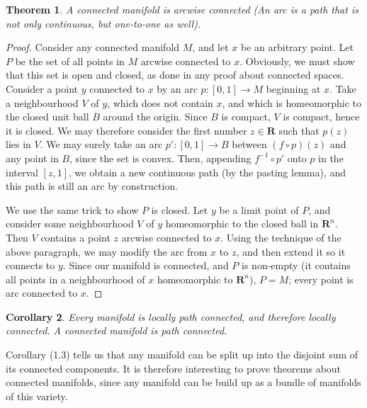 \documentclass[12pt]{report}
\theoremstyle{plain}
\newtheorem{theorem}{Theorem}[chapter]
\newtheorem{corollary}[theorem]{Corollary}
\theoremstyle{definition}
\begin{document}
\begin{theorem}
    A connected manifold is arcwise connected (An arc is a path that is not only continuous, but one-to-one as well).
\end{theorem}
\begin{proof}
    Consider any connected manifold $M$, and let $x$ be an arbitrary point. Let $P$ be the set of all points in $M$ arcwise connected to $x$. Obviously, we must show that this set is open and closed, as done in any proof about connected spaces. Consider a point $y$ connected to $x$ by an arc $p:[0,1] \to M$ beginning at $x$. Take a neighbourhood $V$ of $y$, which does not contain $x$, and which is homeomorphic to the closed unit ball $B$ around the origin. Since $B$ is compact, $V$ is compact, hence it is closed. We may therefore consider the first number $z \in \mathbf{R}$ such that $p(z)$ lies in $V$. We may surely take an arc $p':[0,1] \to B$ between $(f \circ p)(z)$ and any point in $B$, since the set is convex. Then, appending $f^{-1} \circ p'$ onto $p$ in the interval $[z,1]$, we obtain a new continuous path (by the pasting lemma), and this path is still an arc by construction.


    We use the same trick to show $P$ is closed. Let $y$ be a limit point of $P$, and consider some neighbourhood $V$ of $y$ homeomorphic to the closed ball in $\mathbf{R}^n$. Then $V$ contains a point $z$ arcwise connected to $x$. Using the technique of the above paragraph, we may modify the arc from $x$ to $z$, and then extend it so it connects to $y$. Since our manifold is connected, and $P$ is non-empty (it contains all points in a neighbourhood of $x$ homeomorphic to $\mathbf{R}^n$), $P = M$; every point is arc connected to $x$.
\end{proof}

\begin{corollary}
    Every manifold is locally path connected, and therefore locally connected. A connected manifold is path connected.
\end{corollary}

Corollary (1.3) tells us that any manifold can be split up into the disjoint sum of its connected components. It is therefore interesting to prove theorems about connected manifolds, since any manifold can be build up as a bundle of manifolds of this variety.
\end{document}
